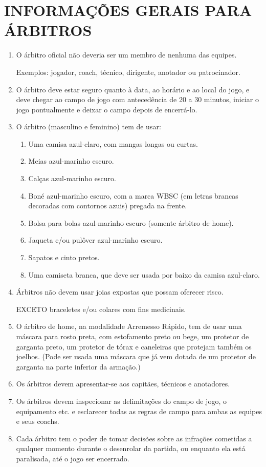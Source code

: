 \section{INFORMAÇÕES GERAIS PARA ÁRBITROS}

\begin{enumerate}[label=(\alph*)]
	\item  O árbitro oficial não deveria ser um membro de nenhuma das equipes.

 Exemplos: jogador, \gls{coach}, técnico, dirigente, anotador ou patrocinador.

 	\item O árbitro deve estar seguro quanto à data, ao horário e ao local do jogo, e deve chegar ao campo de jogo com antecedência de 20 a 30 minutos, iniciar o
jogo pontualmente e deixar o campo depois de encerrá-lo.

	\item O árbitro (masculino e feminino) tem de usar:

	\begin{enumerate}[label=(\arabic*)]
		\item Uma camisa azul-claro, com mangas longas ou curtas.
		\item  Meias azul-marinho escuro.
		\item  Calças azul-marinho escuro.
		\item  Boné azul-marinho escuro, com a marca WBSC (em letras brancas decoradas com contornos azuis) pregada na frente.
		\item  Bolsa para bolas azul-marinho escuro (somente árbitro de \gls{home}).
		\item  Jaqueta e/ou pulôver azul-marinho escuro.
		\item  Sapatos e cinto pretos.
		\item  Uma camiseta branca, que deve ser usada por baixo da camisa azul-claro.
	\end{enumerate}

\item Árbitros não devem usar joias expostas que possam oferecer risco.

 EXCETO braceletes e/ou colares com fins medicinais.

\item O árbitro de \gls{home}, na modalidade Arremesso Rápido, tem de usar uma máscara para rosto preta, com estofamento preto ou bege, um protetor de garganta preto, um protetor de tórax e caneleiras que protejam também os joelhos. (Pode ser usada uma máscara que já vem dotada de um protetor de garganta na parte inferior da armação.)
\item Os árbitros devem apresentar-se aos capitães, técnicos e anotadores.
\item  Os árbitros devem inspecionar as delimitações do campo de jogo, o equipamento etc. e esclarecer todas as regras de campo para ambas as equipes e seus \glspl{coach}.
\item  Cada árbitro tem o poder de tomar decisões sobre as infrações cometidas a qualquer momento durante o desenrolar da partida, ou enquanto ela está paralisada, até o jogo ser encerrado.


\end{enumerate}
